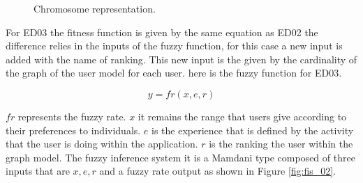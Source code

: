 \begin{figure}
\captionsetup{justification=centering,margin=2cm}
\centering
\setlength\fboxsep{0pt}
\setlength\fboxrule{0.7pt}
\caption{Chromosome representation.}
\label{fig:fis_01}
\end{figure}

For ED03 the fitness function is given by the same equation as ED02 the
difference relies in the inputs of the fuzzy function, for this case a new input
is added with the name of ranking. This new input is the given by the
cardinality of the graph of the user model for each user. here is the fuzzy
function for ED03.

\begin{equation}\label{eq:fuzzyFunc2}
\displaystyle y=fr(x,e,r)
\end{equation}

$fr$ represents the fuzzy rate.
$x$ it remains the range that users give according to their preferences to individuals.
$e$  is the experience that is defined by the
activity that the user is doing within the application.
$r$ is the ranking the user within the graph model.
 The fuzzy inference system it is a Mamdani type composed of three inputs that
are  $x,e, r$ and a fuzzy rate output as shown in Figure \ref{fig:fis_02}.

